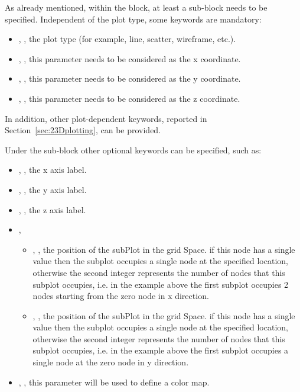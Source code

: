 As already mentioned, within the  block, at least a
 sub-block needs to be specified.
%
Independent of the plot type, some keywords are mandatory:
\begin{itemize}
  \item {}, , the plot type (for
  example, line, scatter, wireframe, etc.).
  \item {}, , this parameter needs
  to be considered as the x coordinate.
  \item {}, , this parameter needs
  to be considered as the y coordinate.
  \item {}, , this
  parameter needs to be considered as the z coordinate.
\end{itemize}
In addition, other plot-dependent keywords, reported in
Section~\ref{sec:23Dplotting}, can be provided.

Under the  sub-block other optional keywords can be specified, such as:
\begin{itemize}
  \item {}, , the x axis
  label.
  \item {}, , the y axis
  label.
  \item {}, ,
  the z axis label.
  \item {}, 
  \begin{itemize}
	\item {}, , the position of the subPlot in the grid Space.
	if this node has a single value then the subplot occupies a single node at the specified location, otherwise
        the second integer represents the number of nodes that this subplot occupies, i.e. in the example above the
        first subplot occupies 2 nodes starting from the zero node in x direction.
	\item {}, , the position of the subPlot in the grid Space.
	if this node has a single value then the subplot occupies a single node at the specified location, otherwise
        the second integer represents the number of nodes that this subplot occupies, i.e. in the example above the
        first subplot occupies a single node at the zero node in y direction.
  \end{itemize}
  \item {}, , this parameter will be used to
  define a color map.
 \end{itemize}

